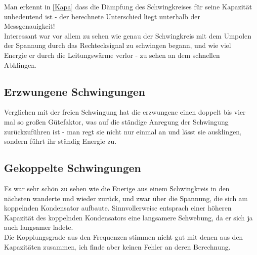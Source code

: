 \documentclass{article}
\begin{document}
Man erkennt in \ref{Kapa} dass die Dämpfung des Schwingkreises für seine Kapazität unbedeutend ist - der berechnete Unterschied liegt unterhalb der Messgenauigkeit!\\

Interessant war vor allem zu sehen wie genau der Schwingkreis mit dem Umpolen der Spannung durch das Rechtecksignal zu schwingen begann, und wie viel Energie er durch die Leitungswärme verlor - zu sehen an dem schnellen Abklingen.
\subsection{Erzwungene Schwingungen}
Verglichen mit der freien Schwingung hat die erzwungene einen doppelt bis vier mal so großen Gütefaktor, was auf die ständige Anregung der Schwingung zurückzuführen ist - man regt sie nicht nur einmal an und lässt sie ausklingen, sondern führt ihr ständig Energie zu. 
\subsection{Gekoppelte Schwingungen}
Es war sehr schön zu sehen wie die Enerige aus einem Schwingkreis in den nächsten wanderte und wieder zurück, und zwar über die Spannung, die sich am koppelnden Kondensator aufbaute. Sinnvollerweise entsprach einer höheren Kapazität des koppelnden Kondensators eine langsamere Schwebung, da er sich ja auch langsamer ladete. \\
Die Kopplungsgrade aus den Frequenzen stimmen nicht gut mit denen aus den Kapazitäten zusammen, ich finde aber keinen Fehler an deren Berechnung.
																			
\end{document}
